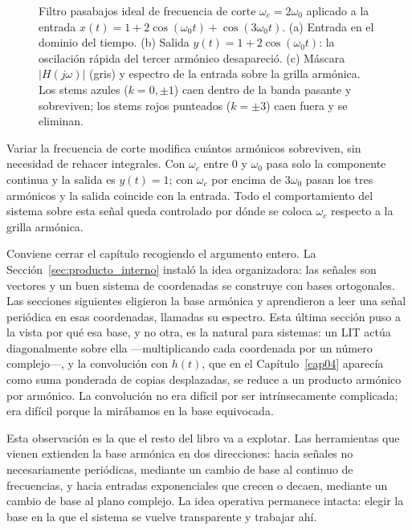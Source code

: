 \documentclass[class=book, crop=false]{standalone}
\begin{document}
\begin{figure}[H]
    \centering
    \begin{minipage}{\linewidth}
        \centering
        
        \caption{Filtro pasabajos ideal de frecuencia de corte $\omega_c = 2\omega_0$ aplicado a la entrada $x(t) = 1 + 2\cos(\omega_0 t) + \cos(3\omega_0 t)$. (a) Entrada en el dominio del tiempo. (b) Salida $y(t) = 1 + 2\cos(\omega_0 t)$: la oscilación rápida del tercer armónico desapareció. (c) Máscara $|H(j\omega)|$ (gris) y espectro de la entrada sobre la grilla armónica. Los stems azules ($k = 0, \pm 1$) caen dentro de la banda pasante y sobreviven; los stems rojos punteados ($k = \pm 3$) caen fuera y se eliminan.}
        \label{fig:pasabajos_ejemplo}
    \end{minipage}
\end{figure}

\medskip
Variar la frecuencia de corte modifica cuántos armónicos sobreviven, sin necesidad de rehacer integrales. Con $\omega_c$ entre $0$ y $\omega_0$ pasa solo la componente continua y la salida es $y(t) = 1$; con $\omega_c$ por encima de $3\omega_0$ pasan los tres armónicos y la salida coincide con la entrada. Todo el comportamiento del sistema sobre esta señal queda controlado por dónde se coloca $\omega_c$ respecto a la grilla armónica.

\medskip
Conviene cerrar el capítulo recogiendo el argumento entero. La Sección~\ref{sec:producto_interno} instaló la idea organizadora: las señales son vectores y un buen sistema de coordenadas se construye con bases ortogonales. Las secciones siguientes eligieron la base armónica y aprendieron a leer una señal periódica en esas coordenadas, llamadas su espectro. Esta última sección puso a la vista por qué esa base, y no otra, es la natural para sistemas: un LIT actúa diagonalmente sobre ella ---multiplicando cada coordenada por un número complejo---, y la convolución con $h(t)$, que en el Capítulo~\ref{cap04} aparecía como suma ponderada de copias desplazadas, se reduce a un producto armónico por armónico. La convolución no era difícil por ser intrínsecamente complicada; era difícil porque la mirábamos en la base equivocada.

Esta observación es la que el resto del libro va a explotar. Las herramientas que vienen extienden la base armónica en dos direcciones: hacia señales no necesariamente periódicas, mediante un cambio de base al continuo de frecuencias, y hacia entradas exponenciales que crecen o decaen, mediante un cambio de base al plano complejo. La idea operativa permanece intacta: elegir la base en la que el sistema se vuelve transparente y trabajar ahí.
\end{document}
